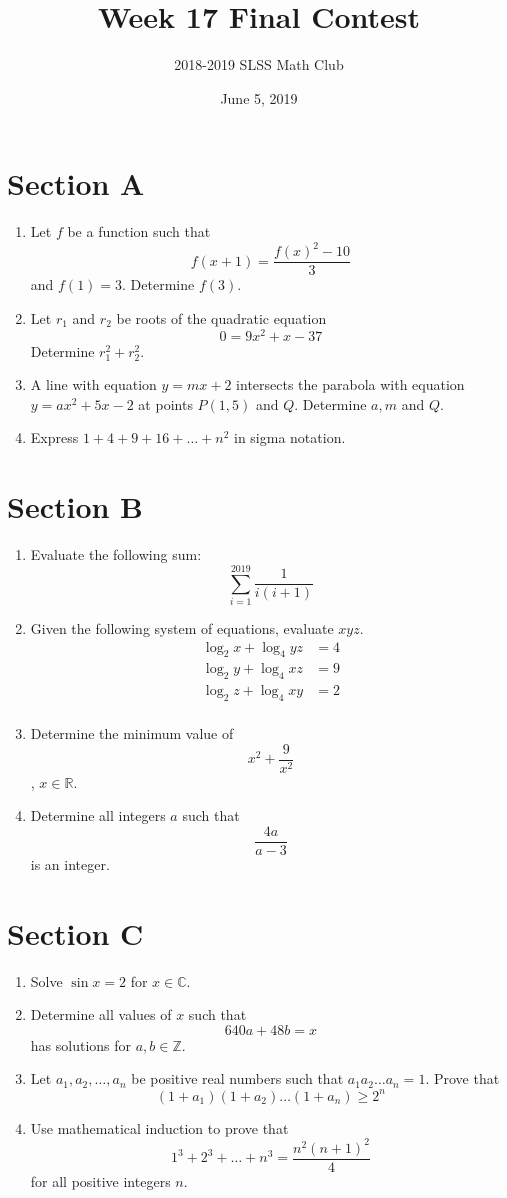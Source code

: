 \documentclass[12pt]{article}
\title{Week 17 Final Contest\vspace{-3mm}}
\author{2018-2019 SLSS Math Club\vspace{-5mm}}
\date{June 5, 2019\vspace{-5mm}}
\begin{document}
\maketitle

\section*{Section A}
\begin{enumerate}
    \item Let $f$ be a function such that $$f(x + 1) = \frac{f(x)^2 - 10}{3}$$ and $f(1) = 3$. Determine $f(3)$.
    \item Let $r_1$ and $r_2$ be roots of the quadratic equation $$0 = 9x^2 + x - 37$$ Determine $r_1^2 + r_2^2$. 
    \item A line with equation $y = mx + 2$ intersects the parabola with equation $y = ax^2 + 5x - 2$ at points $P(1, 5)$ and $Q$. Determine $a, m$ and $Q$.
    \item Express $1 + 4 + 9 + 16 + \dots + n^2$ in sigma notation.
\end{enumerate}

\section*{Section B}
\begin{enumerate}
    \item Evaluate the following sum: $$\sum_{i = 1}^{2019} \frac{1}{i(i + 1)}$$
    \item Given the following system of equations, evaluate $xyz$.
    \begin{align*}
        \log_2{x} + \log_4{yz} &= 4 \\
        \log_2{y} + \log_4{xz} &= 9 \\
        \log_2{z} + \log_4{xy} &= 2 \\
    \end{align*}
    \item Determine the minimum value of $$x^2 + \frac{9}{x^2}$$, $x \in \mathbb{R}$.
    \item Determine all integers $a$ such that $$\frac{4a}{a - 3}$$ is an integer.
\end{enumerate}

\section*{Section C}
\begin{enumerate}
    \item Solve $\sin{x} = 2$ for $x \in \mathbb{C}$.
    \item Determine all values of $x$ such that $$640a + 48b = x$$ has solutions for $a, b \in \mathbb{Z}$.
    \item Let $a_1, a_2, \dots, a_n$ be positive real numbers such that $a_1 a_2 \dots a_n = 1$. Prove that $$(1 + a_1)(1 + a_2)\dots (1 + a_n) \geq 2^n$$
    \item Use mathematical induction to prove that $$1^3 + 2^3 + \dots + n^3 = \frac{n^2(n + 1)^2}{4}$$ for all positive integers $n$.
\end{enumerate}
\end{document}
